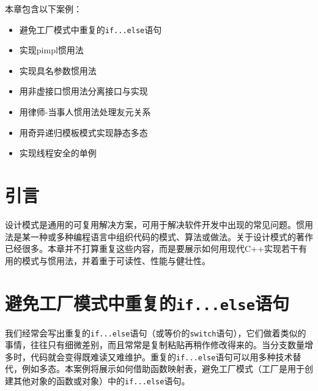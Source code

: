 
本章包含以下案例：



\begin{itemize}
\item 避免工厂模式中重复的\texttt{if...\allowbreak{}else}语句



\item 实现pimpl惯用法



\item 实现具名参数惯用法



\item 用非虚接口惯用法分离接口与实现



\item 用律师-当事人惯用法处理友元关系



\item 用奇异递归模板模式实现静态多态



\item 实现线程安全的单例

\end{itemize}



\section{引言}



设计模式是通用的可复用解决方案，可用于解决软件开发中出现的常见问题。惯用法是某一种或多种编程语言中组织代码的模式、算法或做法。关于设计模式的著作已经很多。本章并不打算重复这些内容，而是要展示如何用现代C++实现若干有用的模式与惯用法，并着重于可读性、性能与健壮性。



\section{避免工厂模式中重复的\texttt{if...\allowbreak{}else}语句}



我们经常会写出重复的\texttt{if...\allowbreak{}else}语句（或等价的\texttt{switch}语句），它们做着类似的事情，往往只有细微差别，而且常常是复制粘贴再稍作修改得来的。当分支数量增多时，代码就会变得既难读又难维护。重复的\texttt{if...\allowbreak{}else}语句可以用多种技术替代，例如多态。本案例将展示如何借助函数映射表，避免工厂模式（工厂是用于创建其他对象的函数或对象）中的\texttt{if...\allowbreak{}else}语句。


